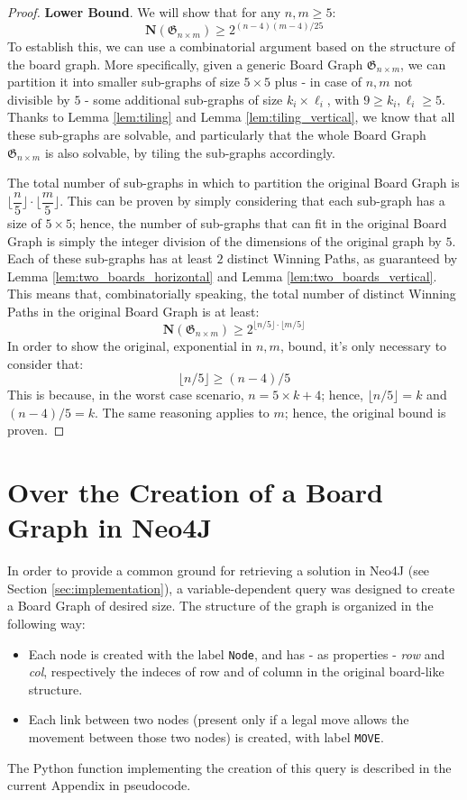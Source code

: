 \documentclass[conference]{IEEEtran}
\begin{document}
\vspace{0.6em}
\begin{proof}
    \textbf{Lower Bound}. We will show that for any $n, m \ge 5$:
    $$
        \mathbf{N}(\mathfrak{G}_{n \times m}) \ge 2^{(n - 4)(m - 4)/25}
    $$
    To establish this, we can use a combinatorial argument based on the structure of the board graph.
    More specifically, given a generic Board Graph $\mathfrak{G}_{n \times m}$, we can partition it into smaller sub-graphs of size $5 \times 5$ plus - in case of $n,m$ not divisible by $5$ - some additional sub-graphs of size $k_i \times \ell_i$, with $9 \ge k_i, \ell_i \ge 5$.
    Thanks to Lemma \ref{lem:tiling} and Lemma \ref{lem:tiling_vertical}, we know that all these sub-graphs are solvable, and particularly that the whole Board Graph $\mathfrak{G}_{n \times m}$ is also solvable, by tiling the sub-graphs accordingly.
    
    The total number of sub-graphs in which to partition the original Board Graph is $\lfloor\dfrac{n}{5}\rfloor \cdot \lfloor\dfrac{m}{5}\rfloor$.
    This can be proven by simply considering that each sub-graph has a size of $5 \times 5$; hence, the number of sub-graphs that can fit in the original Board Graph is simply the integer division of the dimensions of the original graph by $5$.
    Each of these sub-graphs has at least $2$ distinct Winning Paths, as guaranteed by Lemma \ref{lem:two_boards_horizontal} and Lemma \ref{lem:two_boards_vertical}.
    This means that, combinatorially speaking, the total number of distinct Winning Paths in the original Board Graph is at least:
    $$
        \mathbf{N}(\mathfrak{G}_{n \times m}) \ge 2^{\lfloor n/5 \rfloor \cdot \lfloor m/5 \rfloor}
    $$
    In order to show the original, exponential in $n,m$, bound, it's only necessary to consider that:
    $$
        \lfloor n/5 \rfloor \ge (n - 4)/5
    $$
    This is because, in the worst case scenario, $n = 5 \times k + 4$; hence, $\lfloor n/5 \rfloor = k$ and $(n - 4)/5 = k$.
    The same reasoning applies to $m$; hence, the original bound is proven.
\end{proof}

\section{Over the Creation of a Board Graph in Neo4J}		\label{appendix:neo4j}
In order to provide a common ground for retrieving a solution in Neo4J \cite{neo4j} (see Section \ref{sec:implementation}), a variable-dependent query was designed to create a Board Graph of desired size. The structure of the graph is organized in the following way:
\begin{itemize}
	\item Each node is created with the label \texttt{Node}, and has - as properties - \textit{row} and \textit{col}, respectively the indeces of row and of column in the original board-like structure.
	\item Each link between two nodes (present only if a legal move allows the movement between those two nodes) is created, with label \texttt{MOVE}.
\end{itemize}
The Python function implementing the creation of this query is described in the current Appendix in pseudocode.
\end{document}
